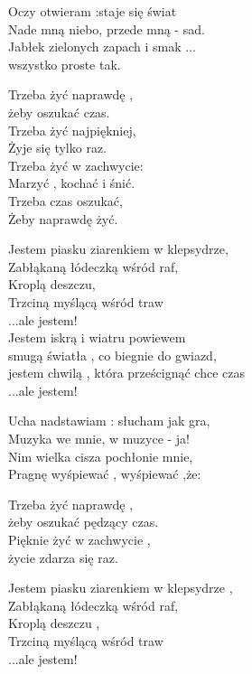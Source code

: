 \begin{text}
    Oczy otwieram :staje się świat\\
    Nade mną niebo, przede mną - sad.\\
    Jabłek zielonych zapach i smak ...\\
    wszystko proste tak.

    Trzeba żyć naprawdę ,\\
    żeby oszukać czas.\\
    Trzeba żyć najpiękniej,\\
    Żyje się tylko raz.\\
    Trzeba żyć w zachwycie:\\
    Marzyć , kochać i śnić.\\
    Trzeba czas oszukać,\\
    Żeby naprawdę żyć.

    Jestem piasku ziarenkiem w klepsydrze,\\
    Zabłąkaną łódeczką wśród raf,\\
    Kroplą deszczu,\\
    Trzciną myślącą wśród traw\\
    ...ale jestem!\\
    Jestem iskrą i wiatru powiewem\\
    smugą światła , co biegnie do gwiazd,\\
    jestem chwilą , która prześcignąć chce czas\\
    ...ale jestem!

    Ucha nadstawiam : słucham jak gra,\\
    Muzyka we mnie, w muzyce - ja!\\
    Nim wielka cisza pochłonie mnie,\\
    Pragnę wyśpiewać , wyśpiewać ,że:

    Trzeba żyć naprawdę ,\\
    żeby oszukać pędzący czas.\\
    Pięknie żyć w zachwycie ,\\
    życie zdarza się raz.

    Jestem piasku ziarenkiem w klepsydrze ,\\
    Zabłąkaną łódeczką wśród raf,\\
    Kroplą deszczu ,\\
    Trzciną myślącą wśród traw\\
    ...ale jestem!


\end{text}
